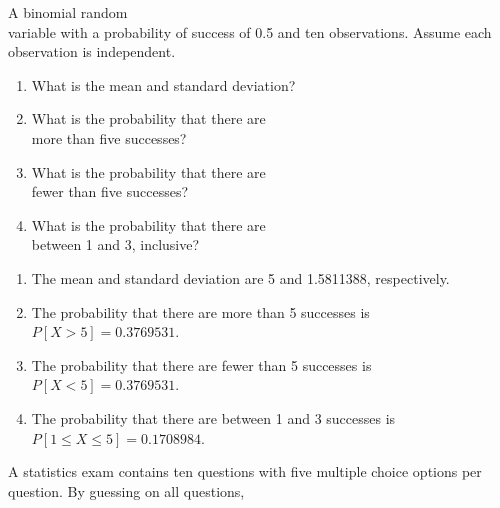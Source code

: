 \documentclass[11pt, chapterprefix=true]{scrbook}\usepackage[]{graphicx}\usepackage[]{color}
\begin{document}
\begin{exercises}
  \begin{exercise} %

A binomial random \\ variable with a probability of success of 0.5 and ten observations. Assume each observation is  independent.

	  \begin{enumerate}
	  \item What is the mean and standard deviation?
    \item What is the probability that there are \\ more than five successes?
    \item What is the probability that there are \\ fewer than five successes?
    \item What is the probability that there are \\ between 1 and 3, inclusive?
	  \end{enumerate}

	\end{exercise}
	\begin{solution}  %


		\begin{enumerate}
	  \item The mean and standard deviation are 5 and 1.5811388, respectively.
    \item The probability that there are more than 5 successes is $P[ X > 5 ] = 0.3769531$.
    \item The probability that there are fewer than 5 successes is $P[ X < 5 ] = 0.3769531$.
    \item The probability that there  are between 1 and 3 successes  is $P[ 1 \le X \le 5 ] = 0.1708984$.
	  \end{enumerate}
	\end{solution}

  \begin{exercise} %

A statistics exam contains ten questions with five multiple choice options per question. By guessing on all questions,


\end{exercise}
\end{exercises}
\end{document}
